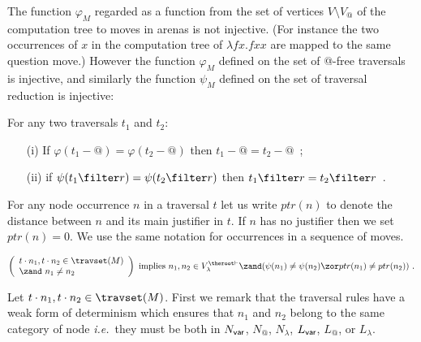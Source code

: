 The function $\varphi_M$ regarded as a function from the set of vertices $V \setminus V_@$ of the computation tree to moves in arenas is not injective. (For instance the two occurrences of $x$ in the computation tree of $\lambda f x. f x x$ are mapped to the same question move.) However the function $\varphi_M$ defined on the set of @-free traversals is injective, and similarly the function $\psi_M$ defined on the set of traversal reduction is injective:
\begin{lemma}
\label{lem:varphiinjective}
For any two traversals $t_1$ and $t_2$:
\begin{itemize}
\item[(i)] If $\varphi (t_1 - @ ) = \varphi (t_2 - @ )$ then $t_1-@ =t_2 -@$\ ;
\item[(ii)] if $\psi (t_1 \filter r ) = \psi (t_2 \filter r )$ then $t_1\filter r = t_2\filter r$\ .
\end{itemize}
\end{lemma}
For any node occurrence $n$ in a traversal $t$ let us write $ptr(n)$
to denote the distance between $n$ and its main justifier in $t$. If
$n$ has no justifier then we set $ptr(n)=0$. We use the same
notation for occurrences in a sequence of moves.

\begin{lemma}
\label{lem:varphiinjective:prelem}
\begin{equation*}
\left(
  \begin{array}{ll}
    t \cdot n_1, t \cdot n_2 \in \travset(M) \\
    \zand\ n_1 \neq n_2
  \end{array}
\right)
 \mbox{ implies } n_1,n_2 \in V^{\theroot\vdash}_{\lambda} \zand ( \psi(n_1) \neq \psi(n_2) \zor ptr(n_1) \neq ptr(n_2) ) \ .
 \end{equation*}
\end{lemma}
\proof Let $t \cdot n_1, t \cdot n_2 \in \travset(M)$. First we
remark that the traversal rules have a weak form of determinism
which ensures that $n_1$ and $n_2$ belong to the same category of
node {\it i.e.}\ they must be both in $N_{\sf var}$, $N_@$,
$N_\lambda$, $L_{\sf var}$, $L_@$, or $L_\lambda$.

